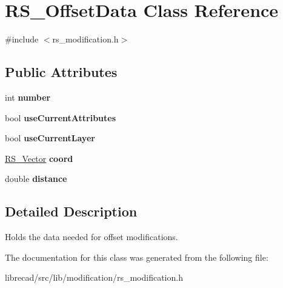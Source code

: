 \hypertarget{classRS__OffsetData}{\section{R\-S\-\_\-\-Offset\-Data Class Reference}
\label{classRS__OffsetData}
}


{\ttfamily \#include $<$rs\-\_\-modification.\-h$>$}

\subsection*{Public Attributes}
\begin{DoxyCompactItemize}
\item 
\hypertarget{classRS__OffsetData_accaf19b989927d9813652d0b1f951bb7}{int {\bfseries number}}\label{classRS__OffsetData_accaf19b989927d9813652d0b1f951bb7}

\item 
\hypertarget{classRS__OffsetData_affde48f09f59e1d077208289f9a87784}{bool {\bfseries use\-Current\-Attributes}}\label{classRS__OffsetData_affde48f09f59e1d077208289f9a87784}

\item 
\hypertarget{classRS__OffsetData_ae56334dbd9c29ecf30fb1cf1c5af1cfd}{bool {\bfseries use\-Current\-Layer}}\label{classRS__OffsetData_ae56334dbd9c29ecf30fb1cf1c5af1cfd}

\item 
\hypertarget{classRS__OffsetData_a4ef8d6a3b9f7cbc2a36a9ce90bc4835a}{\hyperlink{classRS__Vector}{R\-S\-\_\-\-Vector} {\bfseries coord}}\label{classRS__OffsetData_a4ef8d6a3b9f7cbc2a36a9ce90bc4835a}

\item 
\hypertarget{classRS__OffsetData_a4cae6f1d22df8a682c651d5a7909b5ec}{double {\bfseries distance}}\label{classRS__OffsetData_a4cae6f1d22df8a682c651d5a7909b5ec}

\end{DoxyCompactItemize}


\subsection{Detailed Description}
Holds the data needed for offset modifications. 

The documentation for this class was generated from the following file\-:\begin{DoxyCompactItemize}
\item 
librecad/src/lib/modification/rs\-\_\-modification.\-h\end{DoxyCompactItemize}
